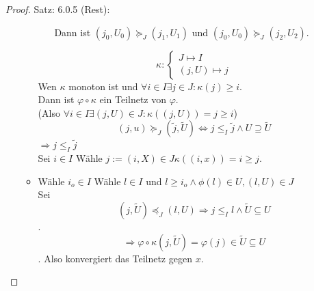 \begin{proof}{Satz: 6.0.5 (Rest):}
\begin{itemize}
\begin{itemize}
\begin{itemize}
        Dann ist $(j_0, U_0) \succeq_J (j_1, U_1)$ und 
        $(j_0, U_0) \succeq_J (j_2, U_2)$.
    \end{itemize}
    $$
    \kappa :
    \begin{cases}
    J\mapsto I \\
    (j,U) \mapsto j
    \end{cases}
    $$
    Wen $\kappa$ monoton ist und $\forall i \in I \exists j \in J : \kappa(j) \geq i$.\\
    Dann ist $\varphi \circ \kappa$ ein Teilnetz von $\varphi$.\\
    (Also $\forall i \in I \exists (j,U) \in J : \kappa((j,U)) = j \geq i$)\\
    $$
    (j,u) \succeq_J (\tilde{j},\tilde{U}) \Leftrightarrow j \leq_I \tilde{j} \wedge U \supseteq \tilde{U}
    $$
    $\Rightarrow j \leq_I \tilde{j}$\\
    Sei $i \in I$ Wähle $j:=(i,X) \in J \kappa((i,x))= i\geq j$.
    \item Wähle $i_o \in I$ Wähle $l \in I$ und $l \geq i_o \wedge \phi(l) \in U,
    (l,U) \in J$\\
    Sei 
    $$(j,\tilde{U}) \preceq_J (l,U) \Rightarrow j \leq_I l \wedge \tilde{U} \subseteq U
    $$.
    $$
    \Rightarrow \varphi \circ \kappa (j,\tilde{U}) = \varphi(j) \in \tilde{U} \subseteq U
    $$.
    Also konvergiert das Teilnetz gegen $x$.
    \end{itemize}

\end{itemize}
\end{proof}